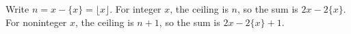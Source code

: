 Write $n=x-\{x\}=\lfloor x\rfloor$. For integer $x$, the ceiling is $n$, so the sum is $\boxed{2x-2\{x\}}$. For noninteger $x$, the ceiling is $n+1$, so the sum is $\boxed{2x-2\{x\}+1}$.
